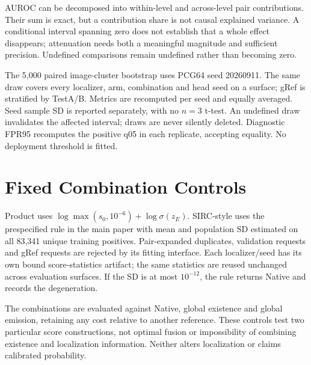 \documentclass[10pt,twocolumn,letterpaper]{article}
\begin{document}
AUROC can be decomposed into within-level and across-level pair
contributions. Their sum is exact, but a contribution share is not
causal explained variance. A conditional interval spanning zero
does not establish that a whole effect disappears; attenuation
needs both a meaningful magnitude and sufficient precision.
Undefined comparisons remain undefined rather than becoming zero.

The 5,000 paired image-cluster bootstrap uses PCG64 seed 20260911.
The same draw covers every localizer, arm, combination and head seed
on a surface; gRef is stratified by TestA/B. Metrics are recomputed
per seed and equally averaged. Seed sample SD is reported separately,
with no $n=3$ t-test. An undefined draw invalidates the affected
interval; draws are never silently deleted.
Diagnostic FPR95 recomputes the positive q05 in each replicate,
accepting equality. No deployment threshold is fitted.

\section{Fixed Combination Controls}
Product uses $\log\max(s_0,10^{-6})+\log\sigma(z_E)$.
SIRC-style \cite{xia2024sirc} uses the prespecified rule in the main
paper with mean and population SD estimated on all 83,341 unique
training positives. Pair-expanded duplicates, validation requests
and gRef requests are rejected by its fitting interface.
Each localizer/seed has its own bound score-statistics artifact;
the same statistics are reused unchanged across evaluation surfaces.
If the SD is at most $10^{-12}$, the rule returns Native and records
the degeneration.

The combinations are evaluated against Native, global existence
and global emission, retaining any cost relative to another reference.
These controls test two particular score constructions, not optimal
fusion or impossibility of combining existence and localization
information. Neither alters localization or claims calibrated probability.
\end{document}
